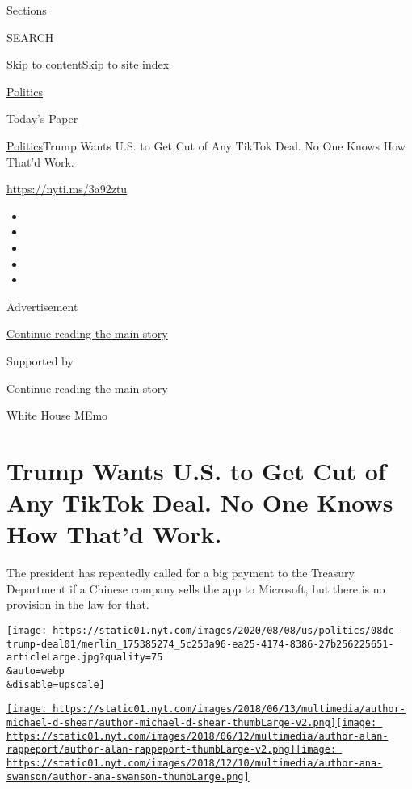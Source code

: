 Sections

SEARCH

\protect\hyperlink{site-content}{Skip to
content}\protect\hyperlink{site-index}{Skip to site index}

\href{https://www.nytimes.com/section/politics}{Politics}

\href{https://myaccount.nytimes.com/auth/login?response_type=cookie\&client_id=vi}{}

\href{https://www.nytimes.com/section/todayspaper}{Today's Paper}

\href{/section/politics}{Politics}\textbar{}Trump Wants U.S. to Get Cut
of Any TikTok Deal. No One Knows How That'd Work.

\href{https://nyti.ms/3a92ztu}{https://nyti.ms/3a92ztu}

\begin{itemize}
\item
\item
\item
\item
\item
\end{itemize}

Advertisement

\protect\hyperlink{after-top}{Continue reading the main story}

Supported by

\protect\hyperlink{after-sponsor}{Continue reading the main story}

White House MEmo

\hypertarget{trump-wants-us-to-get-cut-of-any-tiktok-deal-no-one-knows-how-thatd-work}{%
\section{Trump Wants U.S. to Get Cut of Any TikTok Deal. No One Knows
How That'd
Work.}\label{trump-wants-us-to-get-cut-of-any-tiktok-deal-no-one-knows-how-thatd-work}}

The president has repeatedly called for a big payment to the Treasury
Department if a Chinese company sells the app to Microsoft, but there is
no provision in the law for that.

\texttt{[image: https://static01.nyt.com/images/2020/08/08/us/politics/08dc-trump-deal01/merlin\_175385274\_5c253a96-ea25-4174-8386-27b256225651-articleLarge.jpg?quality=75\\\&auto=webp\\\&disable=upscale]}

\href{https://www.nytimes.com/by/michael-d-shear}{\texttt{[image: https://static01.nyt.com/images/2018/06/13/multimedia/author-michael-d-shear/author-michael-d-shear-thumbLarge-v2.png]}}\href{https://www.nytimes.com/by/alan-rappeport}{\texttt{[image: https://static01.nyt.com/images/2018/06/12/multimedia/author-alan-rappeport/author-alan-rappeport-thumbLarge-v2.png]}}\href{https://www.nytimes.com/by/ana-swanson}{\texttt{[image: https://static01.nyt.com/images/2018/12/10/multimedia/author-ana-swanson/author-ana-swanson-thumbLarge.png]}}

